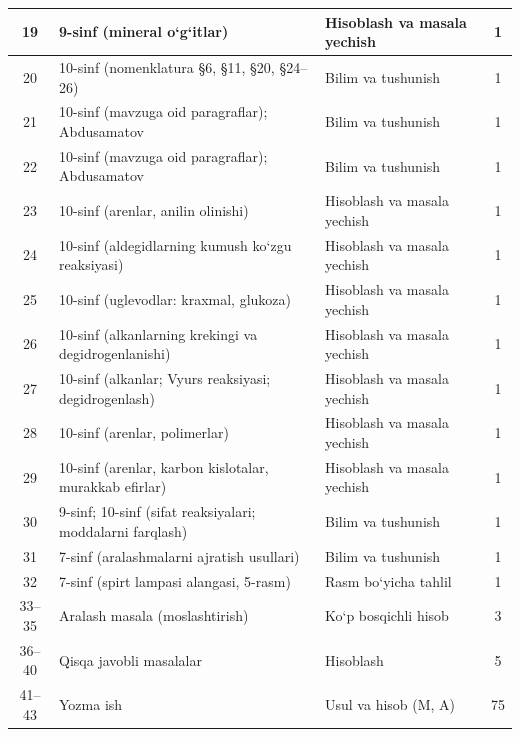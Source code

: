 \documentclass[11pt,a4paper]{article}
\begin{document}
{\begin{longtable}{|c|p{7.2cm}|p{5.4cm}|c|}
19 & 9-sinf (mineral o`g`itlar) & Hisoblash va masala yechish & 1\\\hline
20 & 10-sinf (nomenklatura \S{}6, \S{}11, \S{}20, \S{}24--26) & Bilim va tushunish & 1\\\hline
21 & 10-sinf (mavzuga oid paragraflar); Abdusamatov & Bilim va tushunish & 1\\\hline
22 & 10-sinf (mavzuga oid paragraflar); Abdusamatov & Bilim va tushunish & 1\\\hline
23 & 10-sinf (arenlar, anilin olinishi) & Hisoblash va masala yechish & 1\\\hline
24 & 10-sinf (aldegidlarning kumush ko`zgu reaksiyasi) & Hisoblash va masala yechish & 1\\\hline
25 & 10-sinf (uglevodlar: kraxmal, glukoza) & Hisoblash va masala yechish & 1\\\hline
26 & 10-sinf (alkanlarning krekingi va degidrogenlanishi) & Hisoblash va masala yechish & 1\\\hline
27 & 10-sinf (alkanlar; Vyurs reaksiyasi; degidrogenlash) & Hisoblash va masala yechish & 1\\\hline
28 & 10-sinf (arenlar, polimerlar) & Hisoblash va masala yechish & 1\\\hline
29 & 10-sinf (arenlar, karbon kislotalar, murakkab efirlar) & Hisoblash va masala yechish & 1\\\hline
30 & 9-sinf; 10-sinf (sifat reaksiyalari; moddalarni farqlash) & Bilim va tushunish & 1\\\hline
31 & 7-sinf (aralashmalarni ajratish usullari) & Bilim va tushunish & 1\\\hline
32 & 7-sinf (spirt lampasi alangasi, 5-rasm) & Rasm bo`yicha tahlil & 1\\\hline
33--35 & Aralash masala (moslashtirish) & Ko`p bosqichli hisob & 3\\\hline
36--40 & Qisqa javobli masalalar & Hisoblash & 5\\\hline
41--43 & Yozma ish & Usul va hisob (M, A) & 75\\\hline
\end{longtable}}
\end{document}

